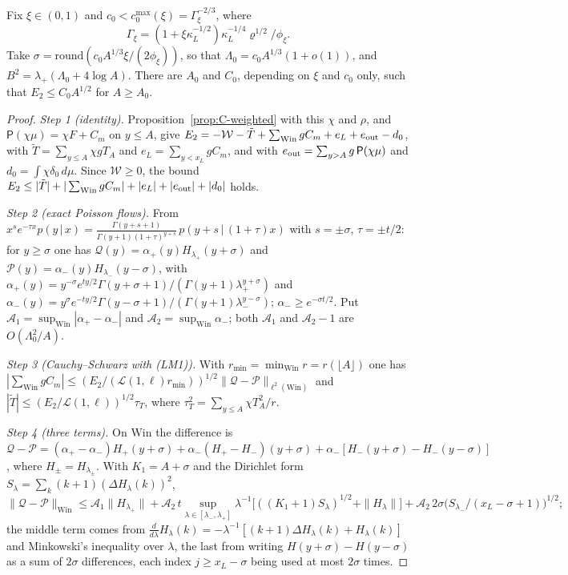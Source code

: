 \begin{proposition}[decay]\label{thm:C-decay}
Fix $\xi\in(0,1)$ and $c_0<c_{0}^{\max}(\xi)=\Gamma_\xi^{-2/3}$, where
\[\Gamma_\xi=(1+\xi\kappa_L^{-1/2})\kappa_L^{-1/4}\varrho^{1/2}/\phi_\xi.\]
Take $\sigma=\mathrm{round}(c_0A^{1/3}\xi/(2\phi_\xi))$, so that $\Lambda_0=c_0A^{1/3}(1+o(1))$, and $B^2=\lambda_+(\Lambda_0+4\log A)$.
There are $A_0$ and $C_0$, depending on $\xi$ and $c_0$ only, such that $E_2\le C_0A^{1/2}$ for $A\ge A_0$.
\end{proposition}
\begin{proof}
\emph{Step 1 (identity).} Proposition~\ref{prop:C-weighted} with this $\chi$ and $\rho$, and $\mathsf P(\chi\mu)=\chi F+C_m$ on $y\le A$,
give $E_2=-\mathcal W-\tilde T+\sum_{\mathrm{Win}}gC_m+e_L+e_{\rm out}-d_0$, with $\tilde T=\sum_{y\le A}\chi gT_A$ and $e_L=\sum_{y<x_L}gC_m$, and with $e_{\rm out}=\sum_{y>A}g\,\mathsf P(\chi\mu)$ and $d_0=\int\chi\delta_0\,d\mu$. Since $\mathcal W\ge0$, the bound $E_2\le|\tilde T|+|\sum_{\mathrm{Win}}gC_m|+|e_L|+|e_{\rm out}|+|d_0|$ holds.

\emph{Step 2 (exact Poisson flows).} From
$x^se^{-\tau x}p(y\,|\,x)=\frac{\Gamma(y+s+1)}{\Gamma(y+1)(1+\tau)^{y+s}}\,p(y+s\,|\,(1+\tau)x)$ with $s=\pm\sigma$, $\tau=\pm t/2$:
for $y\ge\sigma$ one has $\mathcal Q(y)=\alpha_+(y)H_{\lambda_+}(y+\sigma)$ and $\mathcal P(y)=\alpha_-(y)H_{\lambda_-}(y-\sigma)$, with
$\alpha_+(y)=y^{-\sigma}e^{ty/2}\Gamma(y+\sigma+1)/(\Gamma(y+1)\lambda_+^{y+\sigma})$ and
$\alpha_-(y)=y^{\sigma}e^{-ty/2}\Gamma(y-\sigma+1)/(\Gamma(y+1)\lambda_-^{y-\sigma})$; $\alpha_-\ge e^{-\sigma t/2}$. Put
$\mathcal A_1=\sup_{\mathrm{Win}}|\alpha_+-\alpha_-|$ and $\mathcal A_2=\sup_{\mathrm{Win}}\alpha_-$; both $\mathcal A_1$ and $\mathcal A_2-1$
are $O(\Lambda_0^2/A)$.

\emph{Step 3 (Cauchy--Schwarz with (LM1)).} With $r_{\min}=\min_{\mathrm{Win}}r=r(\lfloor A\rfloor)$ one has $|\sum_{\mathrm{Win}}gC_m|\le(E_2/(\mathcal L(1,\ell)r_{\min}))^{1/2}\|\mathcal Q-\mathcal P\|_{\ell^2(\mathrm{Win})}$ and
$|\tilde T|\le(E_2/\mathcal L(1,\ell))^{1/2}\tau_T$, where $\tau_T^2=\sum_{y\le A}\chi T_A^2/r$.

\emph{Step 4 (three terms).} On $\mathrm{Win}$ the difference is $\mathcal Q-\mathcal P=(\alpha_+-\alpha_-)H_+(y+\sigma)+\alpha_-(H_+-H_-)(y+\sigma)+\alpha_-[H_-(y+\sigma)-H_-(y-\sigma)]$, where
$H_\pm=H_{\lambda_\pm}$. With $K_1=A+\sigma$ and the Dirichlet form $S_\lambda=\sum_k(k+1)(\Delta H_\lambda(k))^2$,
\[
\|\mathcal Q-\mathcal P\|_{\mathrm{Win}}\le\mathcal A_1\|H_{\lambda_+}\|
+\mathcal A_2\,t\sup_{\lambda\in[\lambda_-,\lambda_+]}\lambda^{-1}\bigl[((K_1+1)S_\lambda)^{1/2}+\|H_\lambda\|\bigr]
+\mathcal A_2\,2\sigma\bigl(S_{\lambda_-}/(x_L-\sigma+1)\bigr)^{1/2};
\]
the middle term comes from $\frac{d}{d\lambda}H_\lambda(k)=-\lambda^{-1}[(k+1)\Delta H_\lambda(k)+H_\lambda(k)]$ and Minkowski's
inequality over $\lambda$, the last from writing $H(y+\sigma)-H(y-\sigma)$ as a sum of $2\sigma$ differences, each index
$j\ge x_L-\sigma$ being used at most $2\sigma$ times.


\end{proof}
